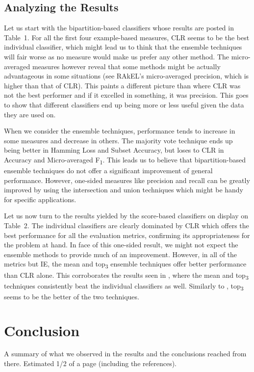 \subsection*{Analyzing the Results}

Let us start with the bipartition-based classifiers whose results are
posted in Table~1. For all the first four example-based measures, CLR
seems to be the best individual classifier, which might lead us to
think that the ensemble techniques will fair worse as no measure would
make us prefer any other method. The micro-averaged measures however
reveal that some methods might be actually advantageous in some
situations (see RAkEL's micro-averaged precision, which is higher than
that of CLR). This paints a different picture than
\cite{sanden2011enhancing} where CLR was not the best performer and if
it excelled in something, it was precision. This goes to show that
different classifiers end up being more or less useful given the data
they are used on.

When we consider the ensemble techniques, performance tends to
increase in some measures and decrease in others. The majority vote
technique ends up being better in Hamming Loss and Subset Accuracy,
but loses to CLR in Accuracy and Micro-averaged
F\textsubscript{1}. This leads us to believe that bipartition-based
ensemble techniques do not offer a significant improvement of general
performance. However, one-sided measures like precision and recall can
be greatly improved by using the intersection and union techniques
which might be handy for specific applications.

Let us now turn to the results yielded by the score-based classifiers
on display on Table~2. The individual classifiers are clearly
dominated by CLR which offers the best performance for all the
evaluation metrics, confirming its appropriateness for the problem at
hand. In face of this one-sided result, we might not expect the
ensemble methods to provide much of an improvement. However, in all of
the metrics but IE, the mean and top\textsubscript{3} ensemble
techniques offer better performance than CLR alone. This corroborates
the results seen in \cite{sanden2011enhancing}, where the mean and
top\textsubscript{3} techniques consistently beat the individual
classifiers as well. Similarly to \cite{sanden2011enhancing},
top\textsubscript{3} seems to be the better of the two techniques.

\section{Conclusion}
A summary of what we observed in the results and the conclusions reached from
there. Estimated 1/2 of a page (including the references).
